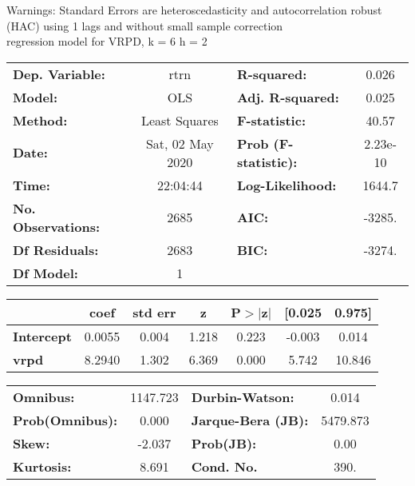 Warnings: \newline
 [1] Standard Errors are heteroscedasticity and autocorrelation robust (HAC) using 1 lags and without small sample correction\\ 

regression model for VRPD, k = 6 h = 2\begin{center}
\begin{tabular}{lclc}
\toprule
\textbf{Dep. Variable:}    &       rtrn       & \textbf{  R-squared:         } &     0.026   \\
\textbf{Model:}            &       OLS        & \textbf{  Adj. R-squared:    } &     0.025   \\
\textbf{Method:}           &  Least Squares   & \textbf{  F-statistic:       } &     40.57   \\
\textbf{Date:}             & Sat, 02 May 2020 & \textbf{  Prob (F-statistic):} &  2.23e-10   \\
\textbf{Time:}             &     22:04:44     & \textbf{  Log-Likelihood:    } &    1644.7   \\
\textbf{No. Observations:} &        2685      & \textbf{  AIC:               } &    -3285.   \\
\textbf{Df Residuals:}     &        2683      & \textbf{  BIC:               } &    -3274.   \\
\textbf{Df Model:}         &           1      & \textbf{                     } &             \\
\bottomrule
\end{tabular}
\begin{tabular}{lcccccc}
                   & \textbf{coef} & \textbf{std err} & \textbf{z} & \textbf{P$> |$z$|$} & \textbf{[0.025} & \textbf{0.975]}  \\
\midrule
\textbf{Intercept} &       0.0055  &        0.004     &     1.218  &         0.223        &       -0.003    &        0.014     \\
\textbf{vrpd}      &       8.2940  &        1.302     &     6.369  &         0.000        &        5.742    &       10.846     \\
\bottomrule
\end{tabular}
\begin{tabular}{lclc}
\textbf{Omnibus:}       & 1147.723 & \textbf{  Durbin-Watson:     } &    0.014  \\
\textbf{Prob(Omnibus):} &   0.000  & \textbf{  Jarque-Bera (JB):  } & 5479.873  \\
\textbf{Skew:}          &  -2.037  & \textbf{  Prob(JB):          } &     0.00  \\
\textbf{Kurtosis:}      &   8.691  & \textbf{  Cond. No.          } &     390.  \\
\bottomrule
\end{tabular}
\end{center}

